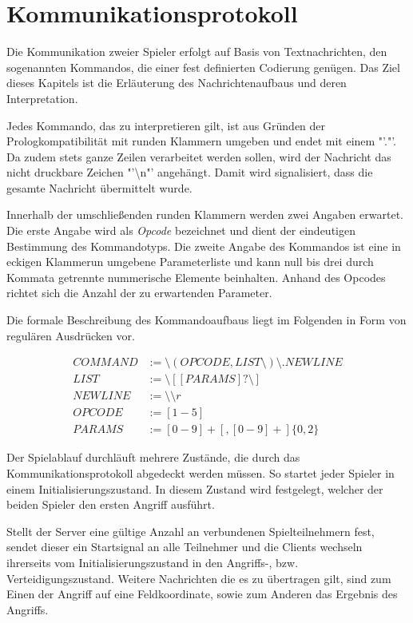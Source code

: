 \section{Kommunikationsprotokoll}
\label{sec:Kommunikationsmodell}

Die Kommunikation zweier Spieler erfolgt auf Basis von Textnachrichten, den sogenannten Kommandos, die einer fest definierten Codierung genügen.
Das Ziel dieses Kapitels ist die Erläuterung des Nachrichtenaufbaus und deren Interpretation.

Jedes Kommando, das zu interpretieren gilt, ist aus Gründen der Prologkompatibilität mit runden Klammern umgeben und endet mit einem "'."'.
Da zudem stets ganze Zeilen verarbeitet werden sollen, wird der Nachricht das nicht druckbare Zeichen "'\textbackslash n"' angehängt.
Damit wird signalisiert, dass die gesamte Nachricht übermittelt wurde.

Innerhalb der umschließenden runden Klammern werden zwei Angaben erwartet.
Die erste Angabe wird als \emph{Opcode} bezeichnet und dient der eindeutigen Bestimmung des Kommandotyps.
Die zweite Angabe des Kommandos ist eine in eckigen Klammerun umgebene Parameterliste und kann null bis drei durch Kommata getrennte nummerische Elemente beinhalten.
Anhand des Opcodes richtet sich die Anzahl der zu erwartenden Parameter.

Die formale Beschreibung des Kommandoaufbaus liegt im Folgenden in Form von regulären Ausdrücken vor.

\begin{align*}
	COMMAND &:= \text{\textbackslash}(OPCODE,LIST\text{\textbackslash}) \text{\textbackslash}. NEWLINE \\
	LIST &:= \text{\textbackslash}[ [PARAMS]? \text{\textbackslash}] \\
	NEWLINE &:= \text{\textbackslash \textbackslash} r \\
	OPCODE &:= [1-5] \\
	PARAMS &:= [0-9]+[,[0-9]+]\{0,2\}
\end{align*}

Der Spielablauf durchläuft mehrere Zustände, die durch das Kommunikationsprotokoll abgedeckt werden müssen.
So startet jeder Spieler in einem Initialisierungszustand.
In diesem Zustand wird festgelegt, welcher der beiden Spieler den ersten Angriff ausführt.

Stellt der Server eine gültige Anzahl an verbundenen Spielteilnehmern fest, sendet dieser ein Startsignal an alle Teilnehmer und die Clients wechseln ihrerseits vom Initialisierungszustand in den Angriffs-, bzw. Verteidigungszustand.
Weitere Nachrichten die es zu übertragen gilt, sind zum Einen der Angriff auf eine Feldkoordinate, sowie zum Anderen das Ergebnis des Angriffs.

